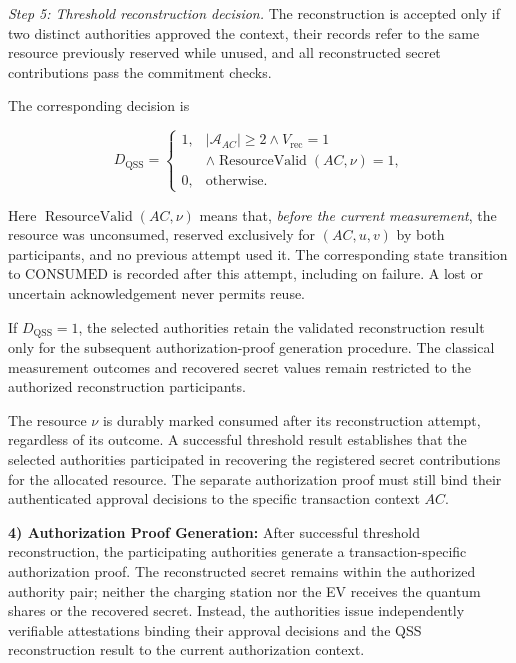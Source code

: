 \documentclass[twocolumn,10pt,journal]{IEEEtran}
\begin{document}
\textit{Step 5: Threshold reconstruction decision.}
The reconstruction is accepted only if two
distinct authorities approved the context,
their records refer to the same resource previously reserved
while unused, and all reconstructed secret contributions
pass the commitment checks.

The corresponding decision is

\begin{equation}
D_{\mathrm{QSS}}=
\begin{cases}
1, &
|\mathcal{A}_{AC}|\geq 2
\land V_{\mathrm{rec}}=1\\
&\land
\operatorname{ResourceValid}(AC,\nu)=1,\\[2pt]
0, & \text{otherwise}.
\end{cases}
\label{eq:qsv2g_qss_threshold_decision}
\end{equation}

Here $\operatorname{ResourceValid}(AC,\nu)$ means that,
\emph{before the current measurement}, the resource was unconsumed,
reserved exclusively for $(AC,u,v)$ by both participants, and no
previous attempt used it. The corresponding state transition to
$\mathrm{CONSUMED}$ is recorded after this attempt, including on
failure. A lost or uncertain acknowledgement never permits reuse.

If $D_{\mathrm{QSS}}=1$, the selected authorities
retain the validated reconstruction result
only for the subsequent authorization-proof
generation procedure. The classical measurement
outcomes and recovered secret values remain
restricted to the authorized reconstruction
participants.

The resource $\nu$ is durably marked consumed after
its reconstruction attempt, regardless of
its outcome. A successful threshold result
establishes that the selected authorities
participated in recovering the registered
secret contributions for the allocated resource.
The separate authorization proof must still
bind their authenticated approval decisions
to the specific transaction context $AC$.

\noindent\textbf{4) Authorization Proof Generation:}
After successful threshold reconstruction, the participating
authorities generate a transaction-specific authorization
proof. The reconstructed secret remains within the
authorized authority pair; neither the charging station
nor the EV receives the quantum shares or the recovered
secret. Instead, the authorities issue independently
verifiable attestations binding their approval decisions
and the QSS reconstruction result to the current
authorization context.
\end{document}
